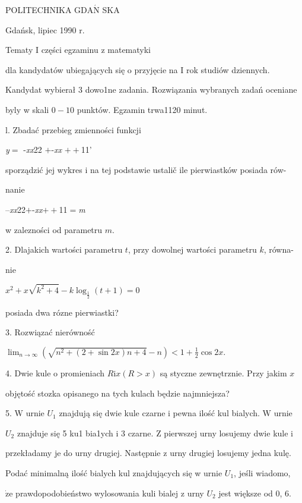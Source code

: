 \documentclass[a4paper,12pt]{article}
\begin{document}
POLITECHNIKA $\mathrm{G}\mathrm{D}\mathrm{A}\acute{\mathrm{N}}$ SKA

Gdańsk, lipiec 1990 r.

Tematy I części egzaminu z matematyki

dla kandydatów ubiegających się o przyjęcie na I rok studiów dziennych.

Kandydat wybierał 3 dowo1ne zadania. Rozwiązania wybranych zadań oceniane

byly w skali $0-10$ punktów. Egzamin trwa1120 minut.

l. Zbadać przebieg zmienności funkcji

{\it y}$=$ -{\it xx}22 $+$-{\it xx} $++$11'

sporządzić jej wykres i na tej podstawie ustalič ile pierwiastków posiada rów-

nanie

--{\it xx}22$+$-{\it xx}$++$11$=${\it m}

w zalezności od parametru $m.$

2. Dlajakich wartości parametru $t$, przy dowolnej wartości parametru $k$, równa-

nie

$x^{2}+x\sqrt{k^{2}+4}-k\log_{\frac{1}{2}}(t+1)=0$

posiada dwa rózne pierwiastki?

3. Rozwiązać nierówność

$\displaystyle \lim_{n\rightarrow\infty}(\sqrt{n^{2}+(2+\sin 2x)n+4}-n)<1+\frac{1}{2}\cos 2x.$

4. Dwie kule o promieniach $R\mathrm{i}x(R>x)$ są styczne zewnętrznie. Przy jakim $x$

objętość stozka opisanego na tych kulach będzie najmniejsza?

5. $\mathrm{W}$ urnie $U_{1}$ znajdują się dwie kule czarne i pewna ilość kul bialych. $\mathrm{W}$ urnie

$U_{2}$ znajduje się 5 ku1 bia1ych i 3 czarne. $\mathrm{Z}$ pierwszej urny losujemy dwie kule i

przekładamy je do urny drugiej. Następnie z urny drugiej losujemy jedna kulę.

Podać minimalną ilość bialych kul znajdujących się w urnie $U_{1}$, jeśli wiadomo,

$\dot{\mathrm{z}}\mathrm{e}$ prawdopodobieństwo wylosowania kuli bialej z urny $U_{2}$ jest większe od 0, 6.
\end{document}

